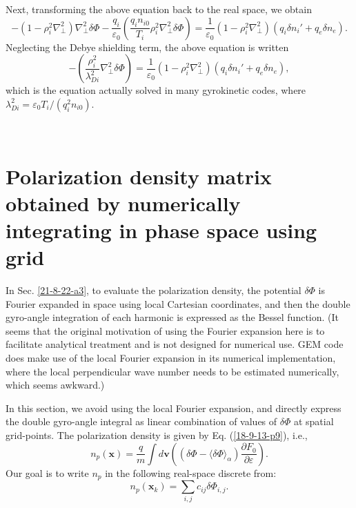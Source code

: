 \documentclass{llncs}
\begin{document}
Next, transforming the above equation back to the real space, we obtain
\begin{equation}
  - (1 - \rho_i^2 \nabla_{\perp}^2) \nabla_{\perp}^2 \delta \Phi -
  \frac{q_i}{\varepsilon_0} \left( \frac{q_i n_{i 0}}{T_i} \rho_i^2
  \nabla_{\perp}^2 \delta \Phi \right) = \frac{1}{\varepsilon_0} (1 - \rho_i^2
  \nabla_{\perp}^2) (q_i \delta n_i' + q_e \delta n_e) .
\end{equation}
Neglecting the Debye shielding term, the above equation is written
\begin{equation}
  - \left( \frac{\rho_i^2}{\lambda_{D i}^2} \nabla_{\perp}^2 \delta \Phi
  \right) = \frac{1}{\varepsilon_0} (1 - \rho_i^2 \nabla_{\perp}^2) (q_i
  \delta n_i' + q_e \delta n_e),
\end{equation}
which is the equation actually solved in many gyrokinetic codes, where
$\lambda_{D i}^2 = \varepsilon_0 T_i / (q_i^2 n_{i 0})$.

\

\section{Polarization density matrix obtained by numerically integrating in
phase space using grid}

In Sec. \ref{21-8-22-a3}, to evaluate the polarization density, the potential
$\delta \Phi$ is Fourier expanded in space using local Cartesian coordinates,
and then the double gyro-angle integration of each harmonic is expressed as
the Bessel function. (It seems that the original motivation of using the
Fourier expansion here is to facilitate analytical treatment and is not
designed for numerical use. GEM code does make use of the local Fourier
expansion in its numerical implementation, where the local perpendicular wave
number needs to be estimated numerically, which seems awkward.)

In this section, we avoid using the local Fourier expansion, and directly
express the double gyro-angle integral as linear combination of values of
$\delta \Phi$ at spatial grid-points. The polarization density is given by Eq.
(\ref{18-9-13-p9}), i.e.,
\begin{equation}
  n_p (\mathbf{x}) = \frac{q}{m} \int d\mathbf{v} \left( (\delta \Phi -
  \langle \delta \Phi \rangle_{\alpha}) \frac{\partial F_0}{\partial
  \varepsilon} \right) .
\end{equation}
Our goal is to write $n_p$ in the following real-space discrete from:
\begin{equation}
  n_p (\mathbf{x}_k) = \sum_{i, j} c_{i j} \delta \Phi_{i, j} .
\end{equation}
\end{document}
